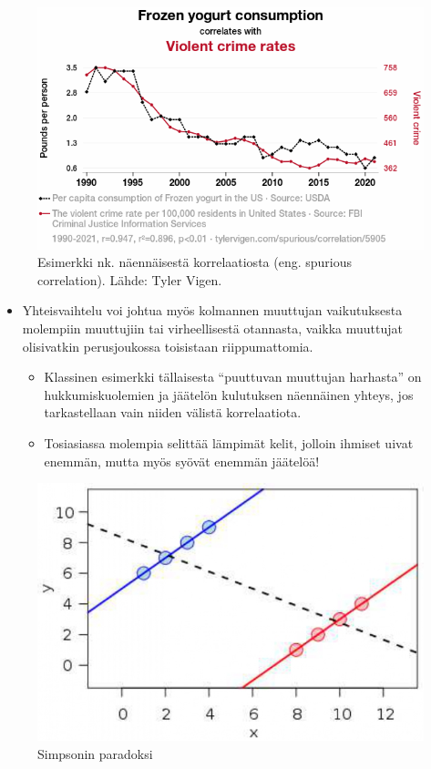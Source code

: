 \documentclass[
]{book}
\providecommand{\tightlist}{%
  \setlength{\itemsep}{0pt}\setlength{\parskip}{0pt}}
\begin{document}
\begin{figure}

{\centering \includegraphics[width=0.9\linewidth]{images/spuriouscorrelation} 

}

\caption{Esimerkki nk. näennäisestä korrelaatiosta (eng. spurious correlation). Lähde: Tyler Vigen.}\label{fig:spuriouskorrelation}
\end{figure}

\begin{itemize}
\tightlist
\item
  Yhteisvaihtelu voi johtua myös kolmannen muuttujan vaikutuksesta molempiin muuttujiin tai virheellisestä otannasta, vaikka muuttujat olisivatkin perusjoukossa toisistaan riippumattomia.

  \begin{itemize}
  \tightlist
  \item
    Klassinen esimerkki tällaisesta ``puuttuvan muuttujan harhasta'' on hukkumiskuolemien ja jäätelön kulutuksen näennäinen yhteys, jos tarkastellaan vain niiden välistä korrelaatiota.
  \item
    Tosiasiassa molempia selittää lämpimät kelit, jolloin ihmiset uivat enemmän, mutta myös syövät enemmän jäätelöä!
  \end{itemize}
\end{itemize}

\FloatBarrier

\begin{figure}

{\centering \includegraphics[width=0.75\linewidth]{images/simpson} 

}

\caption{Simpsonin paradoksi}\label{fig:simpson}
\end{figure}
\end{document}
